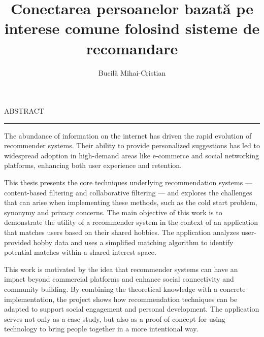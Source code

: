 \documentclass[12pt]{report}
\begin{document}
\title{Conectarea persoanelor bazată pe interese comune folosind sisteme de recomandare}					   
\author{Bucilă Mihai-Cristian}											
				
\maketitle


\newpage
\thispagestyle{empty}
\mbox{}
\newpage
{} 

\cleardoublepage
ABSTRACT
\vspace{0.5cm}	
\hrule
\vspace{0.5cm}	

\par
The abundance of information on the internet has driven the rapid evolution of recommender systems.
Their ability to provide personalized suggestions has led to widespread adoption in high-demand areas like e-commerce and social networking platforms, enhancing both user experience and retention.
\par
This thesis presents the core techniques underlying recommendation systems --- content-based filtering and collaborative filtering --- and explores the challenges that can arise when implementing these methods, such as the cold start problem, synonymy and privacy concerns.
The main objective of this work is to demonstrate the utility of a recommender system in the context of an application that matches users based on their shared hobbies.
The application analyzes user-provided hobby data and uses a simplified matching algorithm to identify potential matches within a shared interest space.
\par
This work is motivated by the idea that recommender systems can have an impact beyond commercial platforms and enhance social connectivity and community building.
By combining the theoretical knowledge with a concrete implementation, the project shows how recommendation techniques can be adapted to support social engagement and personal development.
The application serves not only as a case study, but also as a proof of concept for using technology to bring people together in a more intentional way.

\tableofcontents


\newpage
{}










\end{document}
